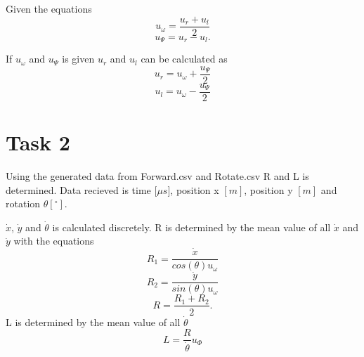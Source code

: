 \documentclass[a4paper,12pt,oneside,onecolumn]{article} %
\begin{document}
Given the equations 
	\begin{equation}
		u_\omega = \frac{u_r + u_l}{2}
	\end{equation}
	\begin{equation}
		u_\Psi = u_r-u_l.
	\end{equation}
	
If $u_\omega$ and $u_\Psi$ is given $u_r$ and $u_l$ can be calculated as
	\begin{equation}
		u_r = u_\omega + \frac{u_\Psi}{2}
	\end{equation}
	\begin{equation}
		u_l =  u_\omega-\frac{u_\Psi}{2}
	\end{equation}
	
\section*{Task 2}

Using the generated data from Forward.csv and Rotate.csv R and L is determined. Data recieved is time $[\mu$$s]$, position x $[m]$, position y $[m]$ and rotation $\theta$$[^{\circ}]$. %

$\dot{x}$, $\dot{y}$ and $\dot{\theta}$ is calculated discretely. R is determined by the mean value of all $\dot{x}$ and $\dot{y}$ with the equations
	\begin{equation}
		R_1 = \frac{\dot{x}}{cos(\theta)u_\omega}
	\end{equation}
	\begin{equation}
		R_2 = \frac{\dot{y}}{sin(\theta)u_\omega}
	\end{equation}
	\begin{equation}
		R = \frac{R_1 + R_2}{2}. %
	\end{equation}
L is determined by the mean value of all $\dot{\theta}$
	\begin{equation}
		L =  \frac{R}{\dot{\theta}}u_\Phi
	\end{equation}
	
\end{document}

